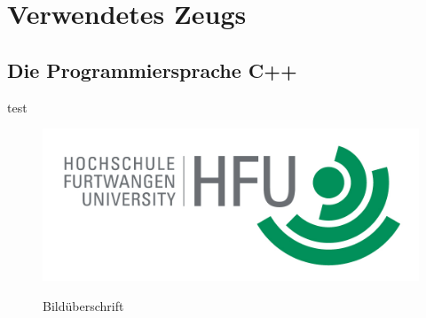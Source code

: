 \chapter{Verwendetes Zeugs}
\section{Die Programmiersprache C++}
test
\begin{figure}
\caption{Bildüberschrift}
\includegraphics[width=1\textwidth]{content/pictures/hfu}
\label{pic:bild3}
\end{figure}